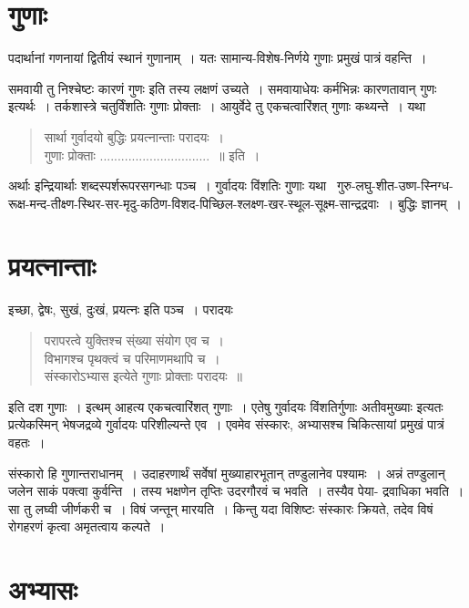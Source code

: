 {\section*{गुणाः}
 
पदार्थानां गणनायां द्वितीयं स्थानं गुणानाम्~। यतः सामान्य-विशेष-निर्णये गुणाः प्रमुखं पात्रं वहन्ति~। 

समवायी तु निश्चेष्टः कारणं गुणः इति तस्य लक्षणं उच्यते~। समवायाधेयः कर्मभिन्नः कारणतावान् गुणः इत्यर्थः~। तर्कशास्त्रे चतुर्विंशतिः गुणाः प्रोक्ताः~। आयुर्वेदे तु एकचत्वारिंशत् गुणाः कथ्यन्ते~। यथा

\begin{verse}
सार्था गुर्वादयो बुद्धिः प्रयत्नान्ताः परादयः~। \\
गुणाः प्रोक्ताः ...............................~॥ इति~। 
\end{verse}
अर्थाः इन्द्रियार्थाः शब्दस्पर्शरूपरसगन्धाः पञ्च~। गुर्वादयः विंशतिः गुणाः यथा \ गुरु-लघु-शीत-उष्ण-स्निग्ध-रूक्ष-मन्द-तीक्ष्ण-स्थिर-सर-मृदु-कठिण-विशद-पिच्छिल-श्लक्ष्ण-खर-स्थूल-सूक्ष्म-सान्द्रद्रवाः~। बुद्धिः ज्ञानम्~। 

\section*{प्रयत्नान्ताः}

इच्छा, द्वेषः, सुखं, दुःखं, प्रयत्नः इति पञ्च~। परादयः

\begin{verse}
परापरत्वे युक्तिश्च स्ंख्या संयोग एव च~। \\
विभागश्च पृथक्त्वं च परिमाणमथापि च~। \\
संस्कारोऽभ्यास इत्येते गुणाः प्रोक्ताः परादयः~॥
\end{verse}
इति दश गुणाः~। इत्थम् आहत्य एकचत्वारिंशत् गुणाः~। एतेषु गुर्वादयः विंशतिर्गुणाः अतीवमुख्याः इत्यतः प्रत्येकस्मिन् भेषजद्रव्ये गुर्वादयः परिशील्यन्ते एव~। एवमेव संस्कारः, अभ्यासश्च चिकित्सायां प्रमुखं पात्रं वहतः~। 

संस्कारो हि गुणान्तराधानम्~। उदाहरणार्थं सर्वेषां मुख्याहारभूतान् तण्डुलानेव पश्यामः~। अन्नं तण्डुलान् जलेन साकं पक्त्वा कुर्वन्ति~। तस्य भक्षणेन तृप्तिः उदरगौरवं च भवति~। तस्यैव पेया- {\fontsize{14}{16}\selectfont {}} द्रवाधिका भवति~। सा तु लघ्वी जीर्णकरी च~। विषं जन्तून् मारयति~। किन्तु यदा विशिष्टः संस्कारः क्रियते, तदेव विषं रोगहरणं कृत्वा अमृतत्वाय कल्पते~। 

\section*{अभ्यासः}

}
